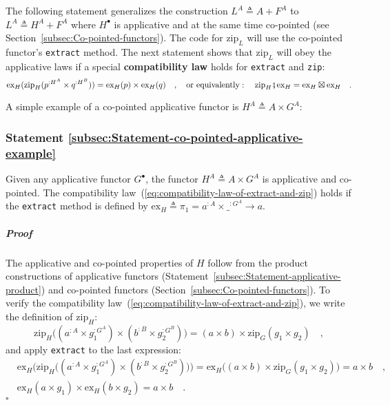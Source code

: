 The following statement generalizes the construction $L^{A}\triangleq A+F^{A}$
to $L^{A}\triangleq H^{A}+F^{A}$ where $H^{\bullet}$ is applicative
and at the same time co-pointed (see Section~\ref{subsec:Co-pointed-functors}).
The code for $\text{zip}_{L}$ will use the co-pointed functor\textsf{'}s \lstinline!extract!
method. The next statement shows that $\text{zip}_{L}$ will obey
the applicative laws if a special \textbf{compatibility law}
holds for \lstinline!extract! and \lstinline!zip!:
\begin{equation}
\text{ex}_{H}(\text{zip}_{H}(p^{:H^{A}}\times q^{:H^{B}}))=\text{ex}_{H}(p)\times\text{ex}_{H}(q)\quad,\quad\text{or equivalently}:\quad\text{zip}_{H}\bef\text{ex}_{H}=\text{ex}_{H}\boxtimes\text{ex}_{H}\quad.\label{eq:compatibility-law-of-extract-and-zip}
\end{equation}

A simple example of a co-pointed applicative functor is $H^{A}\triangleq A\times G^{A}$:

\subsubsection{Statement \label{subsec:Statement-co-pointed-applicative-example}\ref{subsec:Statement-co-pointed-applicative-example}}

Given any applicative functor $G^{\bullet}$, the functor $H^{A}\triangleq A\times G^{A}$
is applicative and co-pointed. The compatibility law~(\ref{eq:compatibility-law-of-extract-and-zip})
holds if the \lstinline!extract! method is defined by $\text{ex}_{H}\triangleq\pi_{1}=a^{:A}\times\_^{:G^{A}}\rightarrow a$.

\subparagraph{Proof}

The applicative and co-pointed properties of $H$ follow from the
product constructions of applicative functors (Statement~\ref{subsec:Statement-applicative-product})
and co-pointed functors (Section~\ref{subsec:Co-pointed-functors}).
To verify the compatibility law~(\ref{eq:compatibility-law-of-extract-and-zip}),
we write the definition of $\text{zip}_{H}$: 
\[
\text{zip}_{H}\big((a^{:A}\times g_{1}^{:G^{A}})\times(b^{:B}\times g_{2}^{:G^{B}})\big)=(a\times b)\times\text{zip}_{G}(g_{1}\times g_{2})\quad,
\]
and apply \lstinline!extract! to the last expression:
\begin{align*}
 & \text{ex}_{H}\big(\text{zip}_{H}\big((a^{:A}\times g_{1}^{:G^{A}})\times(b^{:B}\times g_{2}^{:G^{B}})\big)\big)=\text{ex}_{H}\big((a\times b)\times\text{zip}_{G}(g_{1}\times g_{2})\big)=a\times b\quad,\\
 & \text{ex}_{H}(a\times g_{1})\times\text{ex}_{H}(b\times g_{2})=a\times b\quad.
\end{align*}
$\square$

